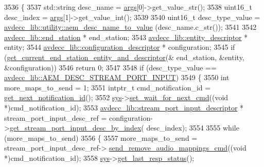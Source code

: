 \begin{DoxyCode}
3536 \{
3537     std::string desc\_name = \hyperlink{namespaceastime__fitline_a8187411843a6284ffb964ef3fb9fcab3}{args}[0]->get\_value\_str();
3538     uint16\_t desc\_index = \hyperlink{namespaceastime__fitline_a8187411843a6284ffb964ef3fb9fcab3}{args}[1]->get\_value\_int();
3539 
3540     uint16\_t desc\_type\_value = \hyperlink{namespaceavdecc__lib_1_1utility_a9f6076e32fa227555a95b6e95ea1e29b}{avdecc\_lib::utility::aem\_desc\_name\_to\_value}
      (desc\_name.c\_str());
3541 
3542     \hyperlink{classavdecc__lib_1_1end__station}{avdecc\_lib::end\_station} * end\_station;
3543     \hyperlink{classavdecc__lib_1_1entity__descriptor}{avdecc\_lib::entity\_descriptor} * entity;
3544     \hyperlink{classavdecc__lib_1_1configuration__descriptor}{avdecc\_lib::configuration\_descriptor} * configuration;
3545     \textcolor{keywordflow}{if} (\hyperlink{classcmd__line_ac2d4611fba7db03d436a2e3c1e64828e}{get\_current\_end\_station\_entity\_and\_descriptor}(&
      end\_station, &entity, &configuration))
3546         \textcolor{keywordflow}{return} 0;
3547 
3548     \textcolor{keywordflow}{if} (desc\_type\_value == \hyperlink{namespaceavdecc__lib_ac7b7d227e46bc72b63ee9e9aae15902fa54a680de439da84c5d5037a246d55b3f}{avdecc\_lib::AEM\_DESC\_STREAM\_PORT\_INPUT})
3549     \{
3550         \textcolor{keywordtype}{int} more\_maps\_to\_send = 1;
3551         intptr\_t cmd\_notification\_id = \hyperlink{classcmd__line_a57486218387d1aa9d262eb7c176154ad}{get\_next\_notification\_id}();
3552         \hyperlink{classcmd__line_a485db4800e331cb4052c447fdf5d154e}{sys}->\hyperlink{classavdecc__lib_1_1system_a26b769584f10225077da47583edda33e}{set\_wait\_for\_next\_cmd}((\textcolor{keywordtype}{void} *)cmd\_notification\_id);
3553         \hyperlink{classavdecc__lib_1_1stream__port__input__descriptor}{avdecc\_lib::stream\_port\_input\_descriptor} * 
      stream\_port\_input\_desc\_ref = configuration->\hyperlink{classavdecc__lib_1_1configuration__descriptor_ad05646251e84a4024f317dd82395b8f7}{get\_stream\_port\_input\_desc\_by\_index}(
      desc\_index);
3554 
3555         \textcolor{keywordflow}{while} (more\_maps\_to\_send)
3556         \{
3557             more\_maps\_to\_send = stream\_port\_input\_desc\_ref->
      \hyperlink{classavdecc__lib_1_1stream__port__input__descriptor_ae22529f0333bc3efc10d16ecb3700cd5}{send\_remove\_audio\_mappings\_cmd}((\textcolor{keywordtype}{void} *)cmd\_notification\_id);
3558             \hyperlink{classcmd__line_a485db4800e331cb4052c447fdf5d154e}{sys}->\hyperlink{classavdecc__lib_1_1system_aa63e8d1a4e51f695cdcccc9340922407}{get\_last\_resp\_status}();

\end{DoxyCode}
